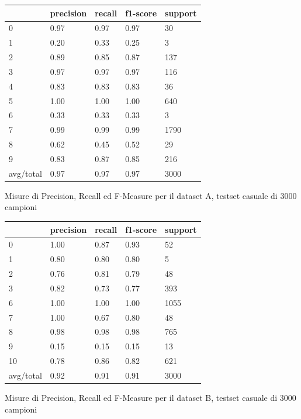 \documentclass[10pt,a4paper]{article}
\begin{document}
	\begin{table}[!htbp]
    \scriptsize
    \centering
    	\begin{tabularx}{0.56\textwidth}{l | llll}
    		{} & {precision} & {recall} & {f1-score} & {support} \\
    		\midrule
            {0} & {0.97} & {0.97} & {0.97} & {30} \\
            {1} & {0.20} & {0.33} & {0.25} & {3} \\
            {2} & {0.89} & {0.85} & {0.87} & {137} \\
            {3} & {0.97} & {0.97} & {0.97} & {116} \\
            {4} & {0.83} & {0.83} & {0.83} & {36} \\
            {5} & {1.00} & {1.00} & {1.00} & {640} \\
            {6} & {0.33} & {0.33} & {0.33} & {3} \\
            {7} & {0.99} & {0.99} & {0.99} & {1790} \\
            {8} & {0.62} & {0.45} & {0.52} & {29} \\
            {9} & {0.83} & {0.87} & {0.85} & {216} \\
            {avg/total} & {0.97} & {0.97} & {0.97} & {3000} \\
    	\end{tabularx}
    	 {Misure di Precision, Recall ed F-Measure per il dataset A, testset casuale di 3000 campioni}
    	\label{tab:a_3ks}
    \end{table}

	\begin{table}[!htbp]
    \scriptsize
    \centering
    	\begin{tabularx}{0.56\textwidth}{l | llll}
    		{} & {precision} & {recall} & {f1-score} & {support} \\
    		\midrule
{ 0} & {1.00} & {0.87} & {0.93} & {  52} \\
{ 1} & {0.80} & {0.80} & {0.80} & {   5} \\
{ 2} & {0.76} & {0.81} & {0.79} & {  48} \\
{ 3} & {0.82} & {0.73} & {0.77} & { 393} \\
{ 6} & {1.00} & {1.00} & {1.00} & {1055} \\
{ 7} & {1.00} & {0.67} & {0.80} & {  48} \\
{ 8} & {0.98} & {0.98} & {0.98} & { 765} \\
{ 9} & {0.15} & {0.15} & {0.15} & {  13} \\
{10} & {0.78} & {0.86} & {0.82} & { 621} \\
{avg/total} & {0.92} & {0.91} & {0.91} & {3000} \\
    	\end{tabularx}
    	 {Misure di Precision, Recall ed F-Measure per il dataset B, testset casuale di 3000 campioni}
    	\label{tab:b_3ks}
    \end{table}
\end{document}
